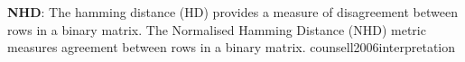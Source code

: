 \documentclass{article}
\begin{document}

  {\textbf{NHD}: The hamming distance (HD) provides a measure of disagreement between rows in a binary matrix. The Normalised Hamming Distance (NHD) metric measures agreement between rows in a binary matrix.}
  {counsell2006interpretation}
\end{document}
